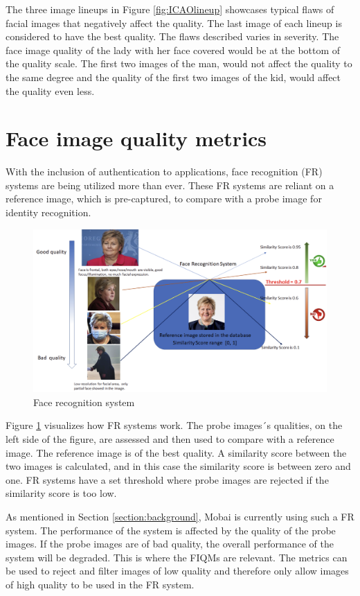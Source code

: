 The three image lineups in Figure \ref{fig:ICAOlineup} showcases typical flaws of facial images that negatively affect the quality. The last image of each lineup is considered to have the best quality. The flaws described varies in severity. The face image quality of the lady with her face covered would be at the bottom of the quality scale. The first two images of the man, would not affect the quality to the same degree and the quality of the first two images of the kid, would affect the quality even less. 
\newpage

\section{Face image quality metrics} 
With the inclusion of authentication to applications, face recognition (FR) systems are being utilized more than ever. These FR systems are reliant on a reference image, which is pre-captured, to compare with a probe image for identity recognition. 

\begin{figure}[h]
    \centering
    \includegraphics[scale = 0.45]{figures/Erna.png}
    \caption{Face recognition system}
    \label{fig:erna}
\end{figure}

Figure \ref{fig:erna} visualizes how FR systems work. The probe images´s qualities, on the left side of the figure, are assessed and then used to compare with a reference image. The reference image is of the best quality. A similarity score between the two images is calculated, and in this case the similarity score is between zero and one. FR systems have a set threshold where probe images are rejected if the similarity score is too low. 

As mentioned in Section \ref{section:background}, Mobai is currently using such a FR system. The performance of the system is affected by the quality of the probe images. If the probe images are of bad quality, the overall performance of the system will be degraded. This is where the FIQMs are relevant. The metrics can be used to reject and filter images of low quality and therefore only allow images of high quality to be used in the FR system. 
\newpage

